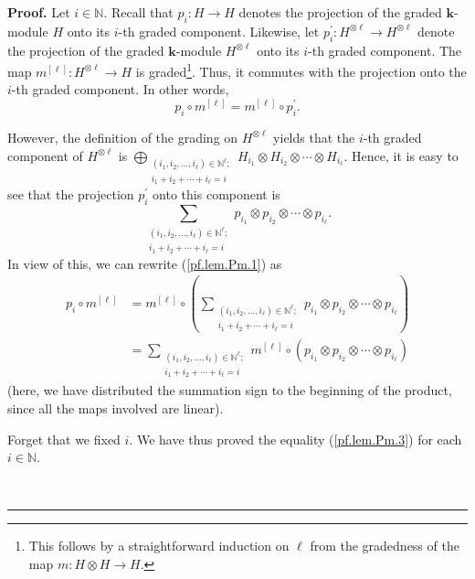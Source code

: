 \documentclass[numbers=enddot,12pt,final,onecolumn,notitlepage]{scrartcl}%
\theoremstyle{definition}
\newenvironment{proof}[1][Proof]{\noindent\textbf{#1.} }{\ \rule{0.5em}{0.5em}}
\let\sumnonlimits\sum
\let\oplusnonlimits\bigoplus
\renewcommand{\sum}{\sumnonlimits\limits}
\renewcommand{\bigoplus}{\oplusnonlimits\limits}
\begin{document}
\begin{proof}
Let $i\in\mathbb{N}$. Recall that $p_{i}:H\rightarrow H$ denotes the
projection of the graded $\mathbf{k}$-module $H$ onto its $i$-th graded
component. Likewise, let $p_{i}^{\prime}:H^{\otimes\ell}\rightarrow
H^{\otimes\ell}$ denote the projection of the graded $\mathbf{k}$-module
$H^{\otimes\ell}$ onto its $i$-th graded component. The map $m^{\left[
\ell\right]  }:H^{\otimes\ell}\rightarrow H$ is graded\footnote{This follows
by a straightforward induction on $\ell$ from the gradedness of the map
$m:H\otimes H\rightarrow H$.}. Thus, it commutes with the projection onto the
$i$-th graded component. In other words,%
\begin{equation}
p_{i}\circ m^{\left[  \ell\right]  }=m^{\left[  \ell\right]  }\circ
p_{i}^{\prime}. \label{pf.lem.Pm.1}%
\end{equation}


However, the definition of the grading on $H^{\otimes\ell}$ yields that the
$i$-th graded component of $H^{\otimes\ell}$ is $\bigoplus_{\substack{\left(
i_{1},i_{2},\ldots,i_{\ell}\right)  \in\mathbb{N}^{\ell};\\i_{1}+i_{2}%
+\cdots+i_{\ell}=i}}H_{i_{1}}\otimes H_{i_{2}}\otimes\cdots\otimes H_{i_{\ell
}}$. Hence, it is easy to see that the projection $p_{i}^{\prime}$ onto this
component is%
\[
\sum_{\substack{\left(  i_{1},i_{2},\ldots,i_{\ell}\right)  \in\mathbb{N}%
^{\ell};\\i_{1}+i_{2}+\cdots+i_{\ell}=i}}p_{i_{1}}\otimes p_{i_{2}}%
\otimes\cdots\otimes p_{i_{\ell}}.
\]
In view of this, we can rewrite (\ref{pf.lem.Pm.1}) as%
\begin{align}
p_{i}\circ m^{\left[  \ell\right]  }  &  =m^{\left[  \ell\right]  }%
\circ\left(  \sum_{\substack{\left(  i_{1},i_{2},\ldots,i_{\ell}\right)
\in\mathbb{N}^{\ell};\\i_{1}+i_{2}+\cdots+i_{\ell}=i}}p_{i_{1}}\otimes
p_{i_{2}}\otimes\cdots\otimes p_{i_{\ell}}\right) \nonumber\\
&  =\sum_{\substack{\left(  i_{1},i_{2},\ldots,i_{\ell}\right)  \in
\mathbb{N}^{\ell};\\i_{1}+i_{2}+\cdots+i_{\ell}=i}}m^{\left[  \ell\right]
}\circ\left(  p_{i_{1}}\otimes p_{i_{2}}\otimes\cdots\otimes p_{i_{\ell}%
}\right)  \label{pf.lem.Pm.3}%
\end{align}
(here, we have distributed the summation sign to the beginning of the product,
since all the maps involved are linear).

Forget that we fixed $i$. We have thus proved the equality (\ref{pf.lem.Pm.3})
for each $i\in\mathbb{N}$.


\end{proof}
\end{document}
